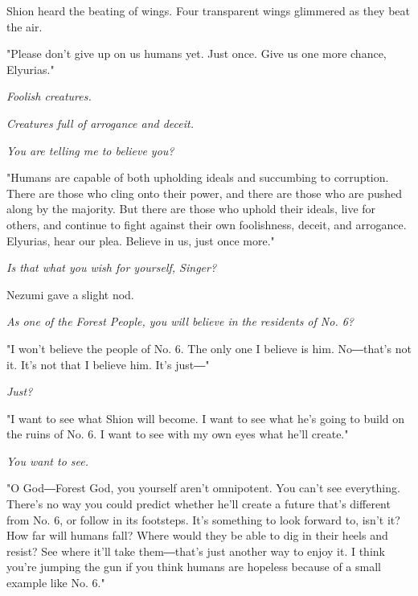Shion heard the beating of wings. Four transparent wings glimmered as
they beat the air.

"Please don't give up on us humans yet. Just once. Give us one more
chance, Elyurias."

\myspace

\emph{Foolish creatures.}

\emph{Creatures full of arrogance and deceit.}

\emph{You are telling me to believe you?}

\myspace

"Humans are capable of both upholding ideals and succumbing to
corruption. There are those who cling onto their power, and there are
those who are pushed along by the majority. But there are those who
uphold their ideals, live for others, and continue to fight against
their own foolishness, deceit, and arrogance. Elyurias, hear our plea.
Believe in us, just once more."

\myspace

\emph{Is that what you wish for yourself, Singer?}

\myspace

Nezumi gave a slight nod.

\myspace

\emph{As one of the Forest People, you will believe in the residents of No. 6?}

\myspace

"I won't believe the people of No. 6. The only one I believe is him.
No―that's not it. It's not that I believe him. It's just―"

\myspace

\emph{Just?}

\myspace

"I want to see what Shion will become. I want to see what he's going to
build on the ruins of No. 6. I want to see with my own eyes what he'll
create."

\myspace

\emph{You want to see.}

\myspace

"O God―Forest God, you yourself aren't omnipotent. You can't see
everything. There's no way you could predict whether he'll create a
future that's different from No. 6, or follow in its footsteps. It's
something to look forward to, isn't it? How far will humans fall? Where
would they be able to dig in their heels and resist? See where it'll
take them―that's just another way to enjoy it. I think you're jumping
the gun if you think humans are hopeless because of a small example like
No. 6."

